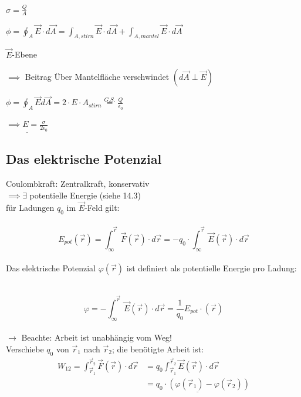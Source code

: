 \documentclass[11pt]{article}
\begin{document}
\hfill\\

$ \sigma=\frac{Q}{A} $

$ \displaystyle\phi = \oint_{A}\vec{E}\cdot d\vec{A}=\int_{A, stirn}^{} \vec{E}\cdot d\vec{A}+\int_{A, mantel}^{} \vec{E}\cdot d\vec{A}   $

$ \vec{E} $-Ebene

$ \implies $ Beitrag Über Mantelfläche verschwindet $ (d\vec{A}\perp\vec{E}) $

$ \phi=\oint_{A} \vec{E}d\vec{A}=2\cdot E\cdot A_{stirn}\overset{G.S.}{=}\frac{Q}{\epsilon_0}$ 

$ \underline{\implies E=\frac{\sigma}{2\epsilon_0}} $

\subsection{Das elektrische Potenzial}

Coulombkraft: Zentralkraft, konservativ\\
$\implies \exists$ potentielle Energie (siehe 14.3)\\
für Ladungen $q_0$ im $\vec{E}$-Feld gilt:\\

\hfill\\
$${\displaystyle \boxed{ E_{pot}(\vec{r})=\int_{\infty}^{\vec{r}} \vec{F}(\vec{r})\cdot d\vec{r} }=-q_0\cdot\int_{\infty}^{\vec{r}} \vec{E}(\vec{r})\cdot d\vec{r}  }$$
\hfill\\

Das elektrische Potenzial $ \varphi(\vec{r}) $ ist definiert als potentielle Energie pro Ladung:

\hfill\\
$$\boxed{\displaystyle\varphi=-\int_{\infty}^{\vec{r}} \vec{E}(\vec{r})\cdot d\vec{r} = \frac{1}{q_0}E_{pot}\cdot (\vec{r})}$$
\hfill\\

$\rightarrow$ Beachte: Arbeit ist unabhängig vom Weg!\\
Verschiebe $q_0$ von $\vec{r}_1$ nach $\vec{r}_2$; die benötigte Arbeit ist:\\

\begin{align*}
	\displaystyle W_{12}= \int_{\vec{r}_1}^{\vec{r}_2} \vec{F}(\vec{r})\cdot d\vec{r} & = q_0\int_{\vec{r}_1}^{\vec{r}_2} \vec{E}(\vec{r})\cdot d\vec{r} \\
	&\underline{ =q_0\cdot(\varphi(\vec{r}_1)-\varphi(\vec{r}_2))}
\end{align*}
\end{document}
